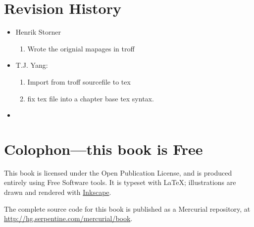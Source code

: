 \section{Revision History}

\begin{itemize}
\item Henrik Storner
 \begin{enumerate}
  \item Wrote the orignial mapages in troff
 \end{enumerate}

\item T.J. Yang:
 \begin{enumerate}
  \item Import from troff sourcefile to tex
  \item fix tex file into a chapter base tex syntax.
 \end{enumerate}
\item 
\end{itemize}

\section{Colophon---this book is Free}

This book is licensed under the Open Publication License, and is
produced entirely using Free Software tools.  It is typeset with
\LaTeX{}; illustrations are drawn and rendered with
\href{http://www.inkscape.org/}{Inkscape}.

The complete source code for this book is published as a Mercurial
repository, at \url{http://hg.serpentine.com/mercurial/book}.

